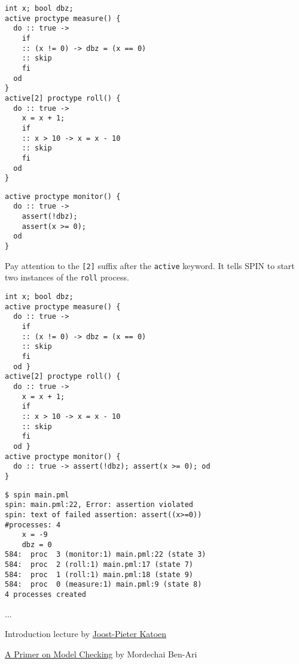 \documentclass{article}
\begin{document}
\begin{pptWide}{2}
{\scriptsize\begin{verbatim}
int x; bool dbz;
active proctype measure() {
  do :: true ->
    if
    :: (x != 0) -> dbz = (x == 0)
    :: skip
    fi
  od
}
active[2] proctype roll() {
  do :: true ->
    x = x + 1;
    if
    :: x > 10 -> x = x - 10
    :: skip
    fi
  od
}
\end{verbatim}
}
\par\columnbreak\par
{\scriptsize\begin{verbatim}
active proctype monitor() {
  do :: true ->
    assert(!dbz);
    assert(x >= 0);
  od
}
\end{verbatim}
}

Pay attention to the \texttt{[2]} suffix after the \texttt{active}
keyword. It tells SPIN to start two instances of the \texttt{roll} process.
\end{pptWide}

\plush{}


\begin{pptWide}{2}
{\scriptsize\begin{verbatim}
int x; bool dbz;
active proctype measure() {
  do :: true ->
    if
    :: (x != 0) -> dbz = (x == 0)
    :: skip
    fi
  od }
active[2] proctype roll() {
  do :: true ->
    x = x + 1;
    if
    :: x > 10 -> x = x - 10
    :: skip
    fi
  od }
active proctype monitor() {
  do :: true -> assert(!dbz); assert(x >= 0); od
}
\end{verbatim}
}
\par\columnbreak\par
{\scriptsize\begin{verbatim}
$ spin main.pml
spin: main.pml:22, Error: assertion violated
spin: text of failed assertion: assert((x>=0))
#processes: 4
    x = -9
    dbz = 0
584:  proc  3 (monitor:1) main.pml:22 (state 3)
584:  proc  2 (roll:1) main.pml:17 (state 7)
584:  proc  1 (roll:1) main.pml:18 (state 9)
584:  proc  0 (measure:1) main.pml:9 (state 8)
4 processes created
\end{verbatim}
}
\end{pptWide}

\plush{}



...


Introduction lecture by \href{https://www.youtube.com/watch?v=VHWEldcSx14}{Joost-Pieter Katoen}

\href{https://spinroot.com/spin/Doc/p40-ben-ari.pdf}{A Primer on Model Checking} by Mordechai Ben-Ari
\end{document}
